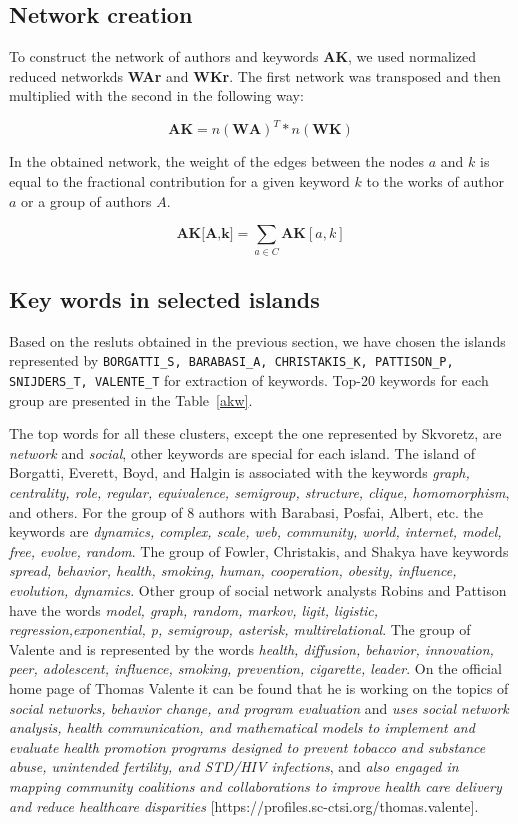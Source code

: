 \documentclass[11pt]{article} %
\begin{document}
\subsection{Network creation}  

To construct the network of authors and keywords \textbf{AK}, we used normalized reduced networkds \textbf{WAr} and \textbf{WKr}. The first network was transposed and then multiplied with the second in the following way: \medskip

\[ \mathbf{AK} = n(\mathbf{WA}) ^ T * n(\mathbf{WK}) \] 

In the obtained network, the  weight of the edges between the nodes $a$ and $k$  is equal to the fractional contribution for a given keyword $k$ to the works of author $a$ or a group of authors $A$. \medskip 

\[ \mathbf{AK\textrm{[A,k]}} = \sum_{a \in C}\mathbf{AK}[a,k] \] 

\subsection{Key words in selected islands}  

Based on the resluts obtained in the previous section, we have chosen the islands represented by \texttt{BORGATTI\_S, BARABASI\_A, CHRISTAKIS\_K, PATTISON\_P, SNIJDERS\_T, VALENTE\_T} for extraction of keywords. Top-20 keywords for each group are presented in the Table~\ref{akw}.\medskip

The top words for all these clusters, except the one represented by Skvoretz, are \textit{network} and \textit{social}, other keywords are special for each island. The island of Borgatti,  Everett, Boyd, and Halgin is associated with the keywords \textit{graph, centrality, role, regular, equivalence, semigroup, structure, clique, homomorphism}, and others. For the group of 8 authors with Barabasi, Posfai, Albert, etc. the keywords are \textit{dynamics, complex, scale,  web, community, world, internet, model, free,  evolve, random}. The group of Fowler, Christakis, and Shakya have keywords \textit{spread, behavior, health, smoking, human, cooperation, obesity, influence, evolution, dynamics}. Other group of social network analysts Robins and Pattison have the words \textit{model, graph, random, markov, ligit, ligistic, regression,exponential, p, semigroup, asterisk, multirelational}. The group of Valente and is represented by the words \textit{health, diffusion, behavior, innovation, peer, adolescent, influence, smoking, prevention, cigarette, leader}. On the official home page of Thomas Valente it can be found that he is working on the topics of  \textit{social networks, behavior change, and program evaluation} and \textit{uses social network analysis, health communication, and mathematical models to implement and evaluate health promotion programs designed to prevent tobacco and substance abuse, unintended fertility, and STD/HIV infections}, and \textit{also engaged in mapping community coalitions and collaborations to improve health care delivery and reduce healthcare disparities} [https://profiles.sc-ctsi.org/thomas.valente]. \medskip 
\end{document}

